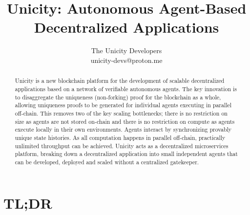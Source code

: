 \documentclass{article}
\title{Unicity: Autonomous Agent-Based Decentralized Applications}
\author{The Unicity Developers\\unicity-devs@proton.me}
\date{}
\begin{document}
\maketitle



\begin{abstract}
\noindent  Unicity is a new  blockchain platform for the development of scalable decentralized applications based on a network of verifiable autonomous agents. The key innovation is to disaggregate the uniqueness (non-forking) proof for the blockchain as a whole, allowing uniqueness proofs to be generated for individual agents executing in parallel off-chain. This removes two of the key scaling bottlenecks; there is no restriction on size as agents are not stored on-chain and there is no restriction on compute as  agents execute locally in their own environments. Agents interact by synchronizing provably unique state histories. As all computation happens in parallel off-chain, practically unlimited throughput can be achieved. Unicity acts as a decentralized microservices platform, breaking down a decentralized application into small independent agents that can be developed, deployed and scaled without a centralized gatekeeper.
\end{abstract}

\section*{TL;DR}
\end{document}
